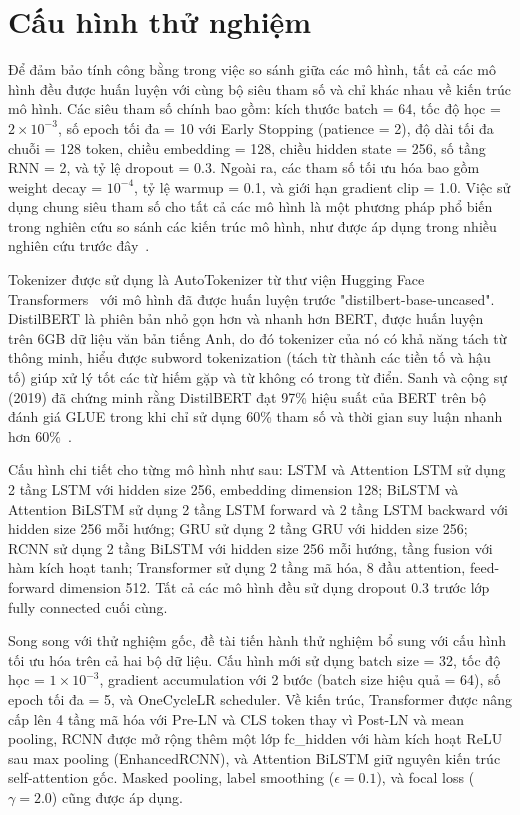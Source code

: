 \documentclass[../BTL.tex]{subfiles}
\begin{document}
\section{Cấu hình thử nghiệm}
Để đảm bảo tính công bằng trong việc so sánh giữa các mô hình, tất cả các mô hình đều được huấn luyện với cùng bộ siêu tham số và chỉ khác nhau về kiến trúc mô hình. Các siêu tham số chính bao gồm: kích thước batch = 64, tốc độ học = $2 \times 10^{-3}$, số epoch tối đa = 10 với Early Stopping (patience = 2), độ dài tối đa chuỗi = 128 token, chiều embedding = 128, chiều hidden state = 256, số tầng RNN = 2, và tỷ lệ dropout = 0.3. Ngoài ra, các tham số tối ưu hóa bao gồm weight decay = $10^{-4}$, tỷ lệ warmup = 0.1, và giới hạn gradient clip = 1.0. Việc sử dụng chung siêu tham số cho tất cả các mô hình là một phương pháp phổ biến trong nghiên cứu so sánh các kiến trúc mô hình, như được áp dụng trong nhiều nghiên cứu trước đây~\cite{vaswani2017transformer,lai2015rcnn}.


Tokenizer được sử dụng là AutoTokenizer từ thư viện Hugging Face Transformers~\cite{wolf2020transformers} với mô hình đã được huấn luyện trước "distilbert-base-uncased". DistilBERT là phiên bản nhỏ gọn hơn và nhanh hơn BERT, được huấn luyện trên 6GB dữ liệu văn bản tiếng Anh, do đó tokenizer của nó có khả năng tách từ thông minh, hiểu được subword tokenization (tách từ thành các tiền tố và hậu tố) giúp xử lý tốt các từ hiếm gặp và từ không có trong từ điển. Sanh và cộng sự (2019) đã chứng minh rằng DistilBERT đạt 97\% hiệu suất của BERT trên bộ đánh giá GLUE trong khi chỉ sử dụng 60\% tham số và thời gian suy luận nhanh hơn 60\%~\cite{sanh2019distilbert}.

Cấu hình chi tiết cho từng mô hình như sau: LSTM và Attention LSTM sử dụng 2 tầng LSTM với hidden size 256, embedding dimension 128; BiLSTM và Attention BiLSTM sử dụng 2 tầng LSTM forward và 2 tầng LSTM backward với hidden size 256 mỗi hướng; GRU sử dụng 2 tầng GRU với hidden size 256; RCNN sử dụng 2 tầng BiLSTM với hidden size 256 mỗi hướng, tầng fusion với hàm kích hoạt tanh; Transformer sử dụng 2 tầng mã hóa, 8 đầu attention, feed-forward dimension 512. Tất cả các mô hình đều sử dụng dropout 0.3 trước lớp fully connected cuối cùng.

Song song với thử nghiệm gốc, đề tài tiến hành thử nghiệm bổ sung với cấu hình tối ưu hóa trên cả hai bộ dữ liệu. Cấu hình mới sử dụng batch size = 32, tốc độ học = $1 \times 10^{-3}$, gradient accumulation với 2 bước (batch size hiệu quả = 64), số epoch tối đa = 5, và OneCycleLR scheduler. Về kiến trúc, Transformer được nâng cấp lên 4 tầng mã hóa với Pre-LN và CLS token thay vì Post-LN và mean pooling, RCNN được mở rộng thêm một lớp fc\_hidden với hàm kích hoạt ReLU sau max pooling (EnhancedRCNN), và Attention BiLSTM giữ nguyên kiến trúc self-attention gốc. Masked pooling, label smoothing ($\epsilon = 0.1$), và focal loss ($\gamma = 2.0$) cũng được áp dụng.
\end{document}
